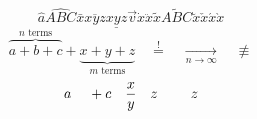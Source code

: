 \documentclass{article}
\begin{document}
\[\hat a\widehat{ABC}\bar x\overline{xyz}\underline{xyz}\vec v\dot x\ddot x\tilde x\widetilde{ABC}\breve x\check x\acute x\grave x\]
\[\overbrace{a+b+c}^{n\text{ terms}}+\underbrace{x+y+z}_{m\text{ terms}}\quad\overset{!}{=}\quad\underset{n\to\infty}{\longrightarrow}\quad\not\equiv\]
\[a\phantom{+b}+c\quad\smash{\frac{x}{y}}\quad\vphantom{\frac{x}{y}}z\quad\hphantom{abc}z\]
\end{document}
